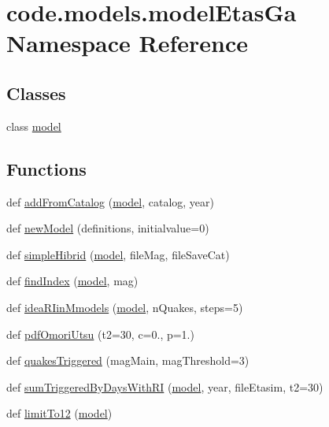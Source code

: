 \hypertarget{namespacecode_1_1models_1_1model_etas_ga}{}\section{code.\+models.\+model\+Etas\+Ga Namespace Reference}
\label{namespacecode_1_1models_1_1model_etas_ga}
\subsection*{Classes}
\begin{DoxyCompactItemize}
\item 
class \hyperlink{classcode_1_1models_1_1model_etas_ga_1_1model}{model}
\end{DoxyCompactItemize}
\subsection*{Functions}
\begin{DoxyCompactItemize}
\item 
def \hyperlink{namespacecode_1_1models_1_1model_etas_ga_a5ebd028c80ed6ec1fa40ad80070ee696}{add\+From\+Catalog} (\hyperlink{classcode_1_1models_1_1model_etas_ga_1_1model}{model}, catalog, year)
\item 
def \hyperlink{namespacecode_1_1models_1_1model_etas_ga_aa6c1725a5692e5e5cde695284f8245e4}{new\+Model} (definitions, initialvalue=0)
\item 
def \hyperlink{namespacecode_1_1models_1_1model_etas_ga_a99b0b810e490c2d38b6cb198e87b85d3}{simple\+Hibrid} (\hyperlink{classcode_1_1models_1_1model_etas_ga_1_1model}{model}, file\+Mag, file\+Save\+Cat)
\item 
def \hyperlink{namespacecode_1_1models_1_1model_etas_ga_a1033b39b8da7b8221b627e93fd63f4be}{find\+Index} (\hyperlink{classcode_1_1models_1_1model_etas_ga_1_1model}{model}, mag)
\item 
def \hyperlink{namespacecode_1_1models_1_1model_etas_ga_ae9c1d72d1b1daea004e956e14b12ae0e}{idea\+R\+Iin\+Mmodels} (\hyperlink{classcode_1_1models_1_1model_etas_ga_1_1model}{model}, n\+Quakes, steps=5)
\item 
def \hyperlink{namespacecode_1_1models_1_1model_etas_ga_a85ce3a0d8bc6fb5485191e374bf24356}{pdf\+Omori\+Utsu} (t2=30, c=0., p=1.)
\item 
def \hyperlink{namespacecode_1_1models_1_1model_etas_ga_a7692aca39690ae67f96a2ba603e5f23c}{quakes\+Triggered} (mag\+Main, mag\+Threshold=3)
\item 
def \hyperlink{namespacecode_1_1models_1_1model_etas_ga_a63915f295f9d14786a5a81bfa8c345ac}{sum\+Triggered\+By\+Days\+With\+RI} (\hyperlink{classcode_1_1models_1_1model_etas_ga_1_1model}{model}, year, file\+Etasim, t2=30)
\item 
def \hyperlink{namespacecode_1_1models_1_1model_etas_ga_a600e69e5c6d90c92ad6406ede3f60318}{limit\+To12} (\hyperlink{classcode_1_1models_1_1model_etas_ga_1_1model}{model})
\end{DoxyCompactItemize}


